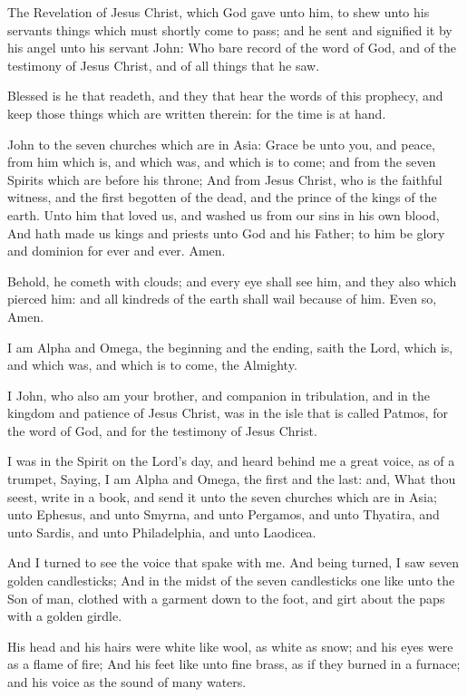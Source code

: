 \Chapter
\Verse The Revelation of Jesus Christ, which God gave unto him, to shew unto his servants things which must shortly come to pass; and he sent and signified it by his angel unto his servant John: \Verse Who bare record of the word of God, and of the testimony of Jesus Christ, and of all things that he saw.

\Verse Blessed is he that readeth, and they that hear the words of this prophecy, and keep those things which are written therein: for the time is at hand.

\Verse John to the seven churches which are in Asia: Grace be unto you, and peace, from him which is, and which was, and which is to come; and from the seven Spirits which are before his throne; \Verse And from Jesus Christ, who is the faithful witness, and the first begotten of the dead, and the prince of the kings of the earth. Unto him that loved us, and washed us from our sins in his own blood, \Verse And hath made us kings and priests unto God and his Father; to him be glory and dominion for ever and ever. Amen.

\Verse Behold, he cometh with clouds; and every eye shall see him, and they also which pierced him: and all kindreds of the earth shall wail because of him. Even so, Amen.

\Verse I am Alpha and Omega, the beginning and the ending, saith the Lord, which is, and which was, and which is to come, the Almighty.

\Verse I John, who also am your brother, and companion in tribulation, and in the kingdom and patience of Jesus Christ, was in the isle that is called Patmos, for the word of God, and for the testimony of Jesus Christ.

\Verse I was in the Spirit on the Lord's day, and heard behind me a great voice, as of a trumpet, \Verse Saying, I am Alpha and Omega, the first and the last: and, What thou seest, write in a book, and send it unto the seven churches which are in Asia; unto Ephesus, and unto Smyrna, and unto Pergamos, and unto Thyatira, and unto Sardis, and unto Philadelphia, and unto Laodicea.

\Verse And I turned to see the voice that spake with me. And being turned, I saw seven golden candlesticks; \Verse And in the midst of the seven candlesticks one like unto the Son of man, clothed with a garment down to the foot, and girt about the paps with a golden girdle.

\Verse His head and his hairs were white like wool, as white as snow; and his eyes were as a flame of fire; \Verse And his feet like unto fine brass, as if they burned in a furnace; and his voice as the sound of many waters.

